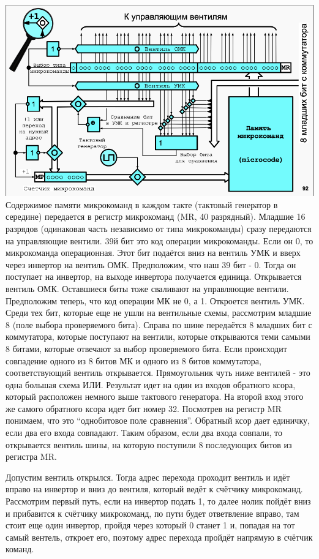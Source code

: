 \documentclass{article}
\begin{document}
\includegraphics[width=1\textwidth]{mpu.png}\\
Содержимое памяти микрокоманд в каждом такте (тактовый генератор в середине) передается в регистр микрокоманд (MR, 40 разрядный). Младшие 16 разрядов (одинаковая часть независимо от типа микрокоманды) сразу передаются на управляющие вентили.
39й бит это код операции микрокоманды. Если он 0, то микрокоманда операционная. Этот бит подаётся вниз на вентиль УМК и вверх через инвертор на вентиль ОМК. Предположим, что наш 39 бит - 0. Тогда он поступает на инвертор, на выходе инвертора получается единица. Открывается вентиль ОМК. Оставшиеся биты тоже сваливают на управляющие вентили.
Предположим теперь, что код операции МК не 0, а 1. Откроется вентиль УМК. Среди тех бит, которые еще не ушли на вентильные схемы, рассмотрим младшие 8 (поле выбора проверяемого бита). 
Справа по шине передаётся 8 младших бит с коммутатора, которые поступают на вентили, которые открываются теми самыми 8 битами, которые отвечают за выбор проверяемого бита. 
Если происходит совпадение одного из 8 битов МК и одного из 8 битов коммутатора, соответствующий вентиль открывается. 
Прямоугольник чуть ниже вентилей - это одна большая схема ИЛИ. Результат идет на один из входов обратного ксора, который расположен немного выше тактового генератора. 
На второй вход этого же самого обратного ксора идет бит номер 32. Посмотрев на регистр MR понимаем, что это “однобитовое поле сравнения”.
Обратный ксор дает единичку, если два его входа совпадают. Таким образом, если два входа совпали, то открывается вентиль шины, на которую поступили 8 последующих битов из регистра MR.


Допустим вентиль открылся. Тогда адрес перехода проходит вентиль и идёт вправо на инвертор и вниз до вентиля, 
который ведёт к счётчику микрокоманд. Рассмотрим первый путь, если на инвертор подать 1, то далее нолик пойдёт вниз и прибавится к счётчику микрокоманд, 
по пути будет ответвление вправо, там стоит еще один инвертор, пройдя через который 0 станет 1 и, попадая на тот самый вентель, откроет его, 
поэтому адрес перехода пройдёт напрямую в счётчик команд.
\end{document}
